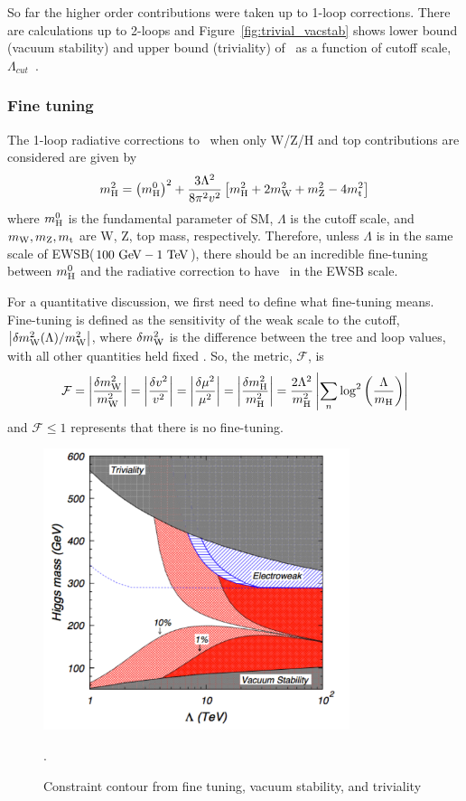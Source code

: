 So far the higher order contributions were taken up to 1-loop corrections. 
There are calculations up to 2-loops and Figure~\ref{fig:trivial_vacstab} 
shows lower bound (vacuum stability) and upper bound (triviality) of \mHi\ 
as a function of cutoff scale, $\Lambda_{cut}$~\cite{Djouadi20081}.

%
\subsubsection{Fine tuning}
The 1-loop radiative corrections to \mHi\ when only W/Z/H and top contributions 
are considered are given by~\cite{Djouadi20081}
\begin{eqnarray} 
m_{\mathrm{H}}^2 
= 
\left( m_{\mathrm{H}}^0 \right)^2 + \frac{3 \Lambda^2}{8\pi^2v^2} 
\left[ m_{\mathrm{H}}^2 + 2m_{\mathrm{W}}^2 + m_{\mathrm{Z}}^2- 4 m_{\mathrm{t}}^2 \right] 
\end{eqnarray} 
where $m_{\mathrm{H}}^0$ is the fundamental parameter of SM, $\Lambda$ is the 
cutoff scale, and $m_{\mathrm{W}}, m_{\mathrm{Z}}, m_{\mathrm{t}}$ are W, Z, top mass, respectively. 
Therefore, unless $\Lambda$ is in the same scale of 
EWSB($100~\mathrm{Ge\kern -0.1em V} - 1~\mathrm{Te\kern -0.1em V}$), there should be an incredible fine-tuning between 
$m_{\mathrm{H}}^0$ and the radiative correction to have \mHi\ in the EWSB scale.  

For a quantitative discussion, we first need to define what fine-tuning means. 
Fine-tuning is defined as the sensitivity of the weak scale to
the cutoff, $\left| \delta m_{\mathrm{W}}^2(\Lambda) / m_{\mathrm{W}}^2 \right|$, where $\delta m_{\mathrm{W}}^2$ is the 
difference between the tree and loop values, with all other quantities held fixed 
\cite{Kolda:2000wi}.
So, the metric, $\mathcal{F}$, is  
\begin{eqnarray} 
\mathcal{F}
= \left| \frac{\delta m_{\mathrm{W}}^2}{m_{\mathrm{W}}^2} \right|
= \left| \frac{\delta v^2}{v^2} \right|
= \left| \frac{\delta \mu^2}{\mu^2} \right|
= \left| \frac{\delta m_{\mathrm{H}}^2}{m_{\mathrm{H}}^2} \right|
= \frac{2\Lambda^2}{m_{\mathrm{H}}^2} \left| \sum_{n} 
  \log^2\left( \frac{\Lambda}{m_{\mathrm{H}}} \right) \right| 
\end{eqnarray} 
and $\mathcal{F} \le 1$ represents that there is no fine-tuning. 

\begin{figure}[t]
\centering
\includegraphics[width=0.8\textwidth]{figures/finetuning.pdf}
\caption{Constraint contour from fine tuning, vacuum stability, and triviality}.
\label{fig:finetuning}
\end{figure}

